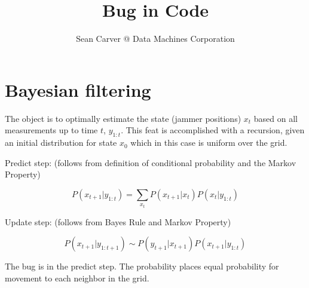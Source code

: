 \documentclass{article}
\title{Bug in Code}
\author{Sean Carver @ Data Machines Corporation}
\begin{document}
\maketitle

\section{Bayesian filtering}

The object is to optimally estimate the state (jammer positions) $x_t$
based on all measurements up to time $t$, $y_{1:t}$.  This feat is
accomplished with a recursion, given an initial distribution for state
$x_0$ which in this case is uniform over the grid.

Predict step: (follows from definition of conditional probability and
the Markov Property)

$$P(x_{t+1}|y_{1:t}) = \sum_{x_t} P(x_{t+1}|x_t) P(x_t|y_{1:t})$$

Update step: (follows from Bayes Rule and Markov Property)

$$P(x_{t+1}|y_{1:t+1}) \sim P(y_{t+1}|x_{t+1}) P(x_{t+1}|y_{1:t})$$

The bug is in the predict step.  The probability places equal
probability for movement to each neighbor in the grid.
\end{document}
